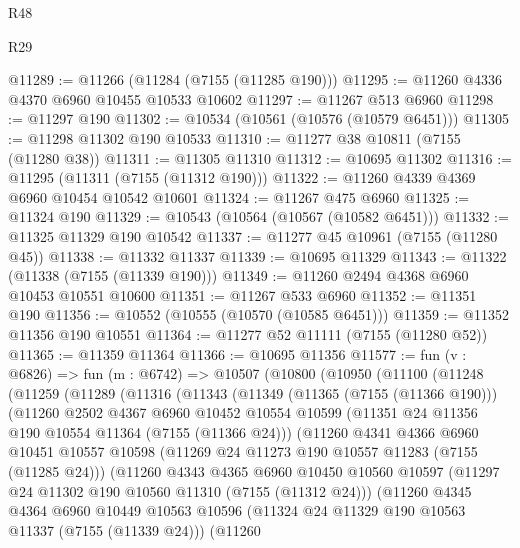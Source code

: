 \begin{lexlean}{R48}
\begin{lexlean}{R29}
\begin{coremodule}
{{{{{{{{{{{{{{{{{{{{{{{{{{{{{{{{{{{{{{{{{{{{{{{{{{{{{{{{{{{{{{{{{{{{{{{{{{{{{{{{{{{{{{{{{{{{{{{{{{{{{{{{{{{{{{{{{{{{{{{{{{{{{{{{{{{{{{{{{{{{{{{{{{{{{{{{{{{{{{{{{{{{{{{{{{{{{{{{{{{{{{{{{{{{{{{{{{{{{{{{{{{{{{{{{{{{{{{{{{@11289 := @11266 (@11284 (@7155 (@11285 @190)))
@11295 := @11260 @4336 @4370 @6960 @10455 @10533 @10602
@11297 := @11267 @513 @6960
@11298 := @11297 @190
@11302 := @10534 (@10561 (@10576 (@10579 @6451)))
@11305 := @11298 @11302 @190 @10533
@11310 := @11277 @38 @10811 (@7155 (@11280 @38))
@11311 := @11305 @11310
@11312 := @10695 @11302
@11316 := @11295 (@11311 (@7155 (@11312 @190)))
@11322 := @11260 @4339 @4369 @6960 @10454 @10542 @10601
@11324 := @11267 @475 @6960
@11325 := @11324 @190
@11329 := @10543 (@10564 (@10567 (@10582 @6451)))
@11332 := @11325 @11329 @190 @10542
@11337 := @11277 @45 @10961 (@7155 (@11280 @45))
@11338 := @11332 @11337
@11339 := @10695 @11329
@11343 := @11322 (@11338 (@7155 (@11339 @190)))
@11349 := @11260 @2494 @4368 @6960 @10453 @10551 @10600
@11351 := @11267 @533 @6960
@11352 := @11351 @190
@11356 := @10552 (@10555 (@10570 (@10585 @6451)))
@11359 := @11352 @11356 @190 @10551
@11364 := @11277 @52 @11111 (@7155 (@11280 @52))
@11365 := @11359 @11364
@11366 := @10695 @11356
@11577 := fun (v : @6826) =>
  fun (m : @6742) =>
  @10507
    (@10800
      (@10950
        (@11100
          (@11248
            (@11259
              (@11289
                (@11316
                  (@11343
                    (@11349
                      (@11365 (@7155 (@11366 @190)))
                      (@11260
                        @2502
                        @4367
                        @6960
                        @10452
                        @10554
                        @10599
                        (@11351 @24 @11356 @190 @10554 @11364 (@7155 (@11366 @24)))
                        (@11260
                          @4341
                          @4366
                          @6960
                          @10451
                          @10557
                          @10598
                          (@11269 @24 @11273 @190 @10557 @11283 (@7155 (@11285 @24)))
                          (@11260
                            @4343
                            @4365
                            @6960
                            @10450
                            @10560
                            @10597
                            (@11297 @24 @11302 @190 @10560 @11310 (@7155 (@11312 @24)))
                            (@11260
                              @4345
                              @4364
                              @6960
                              @10449
                              @10563
                              @10596
                              (@11324 @24 @11329 @190 @10563 @11337 (@7155 (@11339 @24)))
                              (@11260
}}}}}}}}}}}}}}}}}}}}}}}}}}}}}}}}}}}}}}}}}}}}}}}}}}}}}}}}}}}}}}}}}}}}}}}}}}}}}}}}}}}}}}}}}}}}}}}}}}}}}}}}}}}}}}}}}}}}}}}}}}}}}}}}}}}}}}}}}}}}}}}}}}}}}}}}}}}}}}}}}}}}}}}}}}}}}}}}}}}}}}}}}}}}}}}}}}}}}}}}}}}}}}}}}}}}}}}}}}
\end{coremodule}
\end{lexlean}
\end{lexlean}
